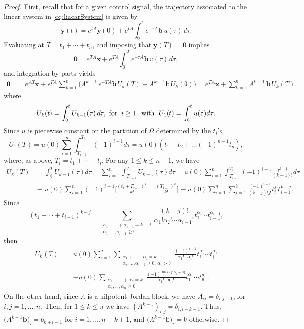 \documentclass[11pt]{amsart}
\theoremstyle{definition}
\theoremstyle{remark}
\numberwithin{equation}{section}
\begin{document}
 \begin{proof}
 First, recall that for a given control signal, the trajectory associated to the linear system in \eqref{eq:linearSystem} is given by 
 \begin{equation*}
 \bm{y}(t)=e^{tA}\bm{y}(0)+e^{tA}\int_{0}^{t}e^{-\tau A}\bm{b}\,u(\tau)\,d\tau. 
 \end{equation*} 
Evaluating at $T=t_1+\cdots+t_n$, and imposing that $\bm{y}(T)=\bm{0}$ implies
 \[\bm{0}=e^{TA}\bm{x}+e^{TA}\int_{0}^{T}e^{-\tau A}\bm{b}\,u(\tau)\, d\tau,
 \]
 and integration by parts yields
 \begin{align}
 \bm{0}&=e^{AT}\bm{x}+e^{TA}\sum_{k=1}^{n} \bigl(A^{k-1}\, e^{-T A}\bm b\, U_k(T)-A^{k-1}\bm b\,U_k(0)\bigr)=e^{TA}\bm{x}+\sum_{k=1}^{n} A^{k-1}\,\bm{b}\,U_k(T),\label{eq:eq}
 \end{align}
 where 
 \[U_{k}(t)=\int_0^t U_{k-1}(\tau)\, d\tau, \text{ for\; } i\geq 1, \text{ with\; } U_1(t)=\int_{0}^t u(\tau) d\tau.
 \]
 Since $u$ is piecewise constant on the partition of $\Omega$ determined by the $t_i$'s, 
 \[U_1(T)=u(0)\sum_{i=1}^{n}\int_{T_{i-1}}^{T_i} (-1)^{i-1}d\tau=u(0)(t_1-t_2+\dots(-1)^{n-1}t_n),\] 
 where, as above, $T_i=t_1+\cdots+t_i$. 
 For any $1\leq k\leq n-1$, we have
 \begin{align*} 
 U_{k}(T)&=\int_{0}^{T}U_{k-1}(\tau)d\tau=\sum_{i=1}^{n}\int_{T_{i-1}}^{T_i}U_{k-1}(\tau)d\tau
 =
 u(0)\sum_{i=1}^n\int_{T_{i-1}}^{T_i} (-1)^{i-1}\frac{\tau^{k-1}}{(k-1)!}d\tau
 \\
 &= u(0)\sum_{i=1}^n (-1)^{i-1}\biggl[\frac{(t_i+T_{i-1})^k}{k!}-\frac{(T_{i-1})^k}{k!}\biggr]= u(0)\sum_{i=1}^n\sum_{j=1}^k\frac{(-1)^{i-1}}{(k-j)!j!}t_i^jT_{i-1}^{k-j}.\nonumber
 \end{align*}
 Since
 \[\left(t_1+\cdots+t_{i-1}\right)^{k-j}
 =
 \sum_{\substack{\alpha_1+\cdots+\alpha_{i-1}=k-j\\ \alpha_{1},\dots,\alpha_{i-1}\geq 0}}\frac{(k-j)!}{\alpha_{1}! \alpha_{2}!\cdots \alpha_{i-1}!}t_1^{\alpha_1} \cdots t_{i-1}^{\alpha_{i-1}},
 \]
 then
 \begin{align}
 U_{k}(T)&=
 u(0)\sum_{i=1}^n\sum_{\substack{\alpha_1+\cdots+\alpha_{i}=k\\\alpha_i,\dots,\alpha_{i-1}\geq 0,\,\alpha_i>0}}\frac{(-1)^{i-1}}{\alpha_{1}!\cdots \alpha_{i}!}t_1^{\alpha_1} \cdots t_{i}^{\alpha_{i}}\nonumber\\
 &=
 -u(0)\sum_{\substack{\alpha_1+\dots+\alpha_n=k\\\alpha_1,\ldots,\alpha_n\geq0}}\frac{(-1)^{\max\{j\colon \alpha_j\neq 0\}}}{\alpha_{1}! \cdots \alpha_{n}!}t_1^{\alpha_1}\cdots t_n^{\alpha_n}.\label{eq:sum}
 \end{align}
 On the other hand, since $A$ is a nilpotent Jordan block, we have $A_{ij}=\delta_{i,j-1}$, for $i,j=1, \dots, n$.
 Then, for $1\leq k\leq n$ we have $(A^{k-1})_{i,j}=\delta_{i,i+k-1}$. Thus, $\bigl( A^{k-1}\bm{b}\bigr)_{i}=b_{k+i-1}$ for $i=1,\dots, n-k+1$, and $\bigl( A^{k-1}\bm{b}\bigr)_{i}=0$ otherwise.
 

\end{proof}
\end{document}
